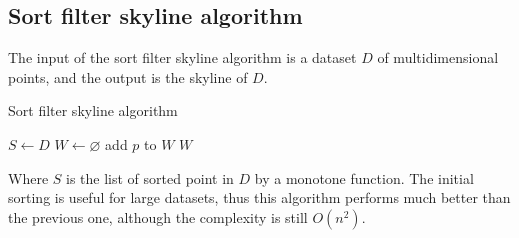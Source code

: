 \documentclass[12pt, a4paper]{report}
\begin{document}
    \subsection{Sort filter skyline algorithm}
    The input of the sort filter skyline algorithm is a dataset $D$ of multidimensional points, and the output is the skyline of $D$.
    \begin{algorithm}[H]
        \caption{Sort filter skyline algorithm}
            \begin{algorithmic}[1]
                \State $S \leftarrow D$
                \State $W \leftarrow \varnothing$
                        \State add $p$ to $W$
                    \EndIf
                \EndFor
                \State \Return $W$
            \end{algorithmic}
    \end{algorithm}
    Where $S$ is the list of sorted point in $D$ by a monotone function. The initial sorting is useful for large datasets, thus this algorithm performs much better than the
    previous one, although the complexity is still $O(n^2)$. 
\end{document}
